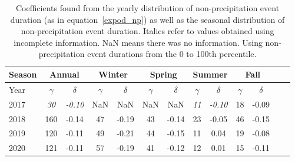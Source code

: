 \begin{table}[htb]
  \begin{center}
    \begin{tabular}{|l|*{11}{c|}r|}
      \hline
      Season    &       \multicolumn{2}{|c|}{Annual}          & \multicolumn{2}{|c|}{Winter}& \multicolumn{2}{|c|}{Spring}  & \multicolumn{2}{|c|}{Summer} &\multicolumn{2}{|c|}{Fall}  \\
      \hline
      Year      & $\gamma $ & $\delta$  & $\gamma $ & $\delta$ & $\gamma $ & $\delta$ & $\gamma $ & $\delta$ & $\gamma $ & $\delta$\\
      \hline
      2017      & \textit{30}  & \textit{-0.10}  & NaN & NaN & NaN & NaN & \textit{11}  & \textit{-0.10}  & 18  & -0.09  \\
      2018      & 160           & -0.14  & 47 & -0.19 & 43 & -0.14 & 23  & -0.05  & 46 & -0.15  \\
      2019      & 120           & -0.11  & 49 & -0.21 & 44 & -0.15 & 11 & 0.04 & 19 & -0.08   \\
      2020      & 121           & -0.11  & 57 & -0.19 & 41 & -0.12 & 12  & 0.01  & 15 & -0.11 \\
      \hline
    \end{tabular}
  \end{center}
  \caption[Year comparison of coefficients for non-precipitation events up
    to 100th percentile] {\label{thirdtable_100}Coefficients found from the
    yearly distribution of non-precipitation event duration (as in
    equation~\ref{expod_np}) as well as the seasonal distribution of
    non-precipitation event duration. Italics refer to values obtained using
    incomplete information. NaN means there was no information. Using
    non-precipitation event durations from the 0 to 100th percentile.}
\end{table}

